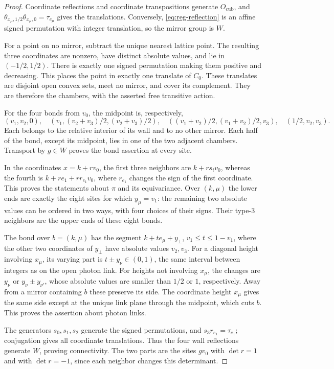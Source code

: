 \begin{proof}
Coordinate reflections and coordinate transpositions generate
$O_{\mathrm{cub}}$, and
$\theta_{x_\mu,1/2}\theta_{x_\mu,0}=\tau_{e_\mu}$ gives the
translations. Conversely, \eqref{eq:reg-reflection} is an affine signed
permutation with integer translation, so the mirror group is $W$.

For a point on no mirror, subtract the unique nearest lattice point.
The resulting three coordinates are nonzero, have distinct absolute
values, and lie in $(-1/2,1/2)$. There is exactly one signed
permutation making them positive and decreasing. This places the
point in exactly one translate of $C_0$. These translates are disjoint
open convex sets, meet no mirror, and cover its complement. They are
therefore the chambers, with the asserted free transitive action.

For the four bonds from $v_0$, the midpoint is, respectively,
\[
 (v_1,v_2,0),\quad
 (v_1,(v_2+v_3)/2,(v_2+v_3)/2),\quad
 ((v_1+v_2)/2,(v_1+v_2)/2,v_3),\quad
 (1/2,v_2,v_3).
\]
Each belongs to the relative interior of its wall and to no other
mirror. Each half of the bond, except its midpoint, lies in one of
the two adjacent chambers. Transport by $g\in W$ proves the bond
assertion at every site.

In the coordinates $x=k+rv_0$, the first three neighbors are
$k+rs_iv_0$, whereas the fourth is
$k+re_1+rr_{e_1}v_0$, where $r_{e_1}$ changes the sign of the first
coordinate. This proves the statements about $\pi$ and its
equivariance. Over $(k,\mu)$ the lower ends are exactly the eight
sites for which $y_\mu=v_1$: the remaining two absolute values can
be ordered in two ways, with four choices of their signs. Their
type-$3$ neighbors are the upper ends of these eight bonds.

The bond over $b=(k,\mu)$ has the segment
$k+te_\mu+y_\perp$, $v_1\le t\le1-v_1$, where the other two
coordinates of $y_\perp$ have absolute values $v_2,v_3$. For a
diagonal height involving $x_\mu$, its varying part is
$t\pm y_\nu\in(0,1)$, the same interval between integers as on the
open photon link. For heights not involving $x_\mu$, the changes
are $y_\nu$ or $y_\nu\pm y_{\nu'}$, whose absolute values are
smaller than $1/2$ or $1$, respectively. Away from a mirror
containing $b$ these preserve its side. The coordinate height
$x_\mu$ gives the same side except at the unique link plane through
the midpoint, which cuts $b$. This proves the assertion about
photon links.

The generators $s_0,s_1,s_2$ generate the signed permutations, and
$s_3r_{e_1}=\tau_{e_1}$; conjugation gives all coordinate translations.
Thus the four wall reflections generate $W$, proving connectivity.
The two parts are the sites $gv_0$ with $\det r=1$ and with
$\det r=-1$, since each neighbor changes this determinant.
\end{proof}

